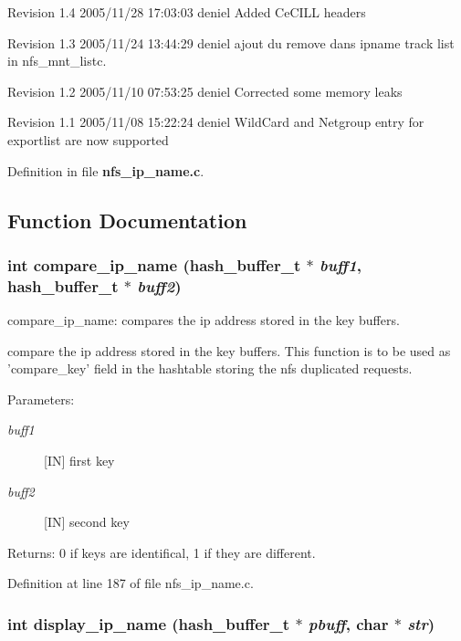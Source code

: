 Revision 1.4 2005/11/28 17:03:03 deniel Added Ce\-CILL headers

Revision 1.3 2005/11/24 13:44:29 deniel ajout du remove dans ipname track list in nfs\_\-mnt\_\-listc.

Revision 1.2 2005/11/10 07:53:25 deniel Corrected some memory leaks

Revision 1.1 2005/11/08 15:22:24 deniel Wild\-Card and Netgroup entry for exportlist are now supported

Definition in file {\bf nfs\_\-ip\_\-name.c}.

\subsection{Function Documentation}
\subsubsection{\setlength{\rightskip}{0pt plus 5cm}int compare\_\-ip\_\-name (hash\_\-buffer\_\-t $\ast$ {\em buff1}, hash\_\-buffer\_\-t $\ast$ {\em buff2})}\label{nfs__ip__name_8c_a5}


compare\_\-ip\_\-name: compares the ip address stored in the key buffers.

compare the ip address stored in the key buffers. This function is to be used as 'compare\_\-key' field in the hashtable storing the nfs duplicated requests.

\begin{Desc}
\item[Parameters:]
\begin{description}
\item[{\em buff1}][IN] first key \item[{\em buff2}][IN] second key\end{description}
\end{Desc}
\begin{Desc}
\item[Returns:]0 if keys are identifical, 1 if they are different. \end{Desc}


Definition at line 187 of file nfs\_\-ip\_\-name.c.
\subsubsection{\setlength{\rightskip}{0pt plus 5cm}int display\_\-ip\_\-name (hash\_\-buffer\_\-t $\ast$ {\em pbuff}, char $\ast$ {\em str})}\label{nfs__ip__name_8c_a6}


